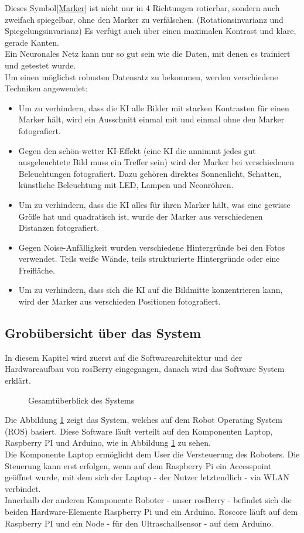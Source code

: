 \documentclass[conference]{IEEEtran}
\begin{document}
	Dieses Symbol\ref{Marker} ist nicht nur in 4 Richtungen rotierbar, sondern auch zweifach spiegelbar, ohne den Marker zu verfälschen. (Rotationsinvarianz und Spiegelungsinvarianz)
	Es verfügt auch über einen maximalen Kontrast und klare, gerade Kanten.
	\\
	\noindent
	Ein Neuronales Netz kann nur so gut sein wie die Daten, mit denen es 
	trainiert und getestet wurde.
	\\
	Um einen möglichst robusten Datensatz zu bekommen, werden verschiedene Techniken angewendet:
	\begin{itemize}
		\item Um zu verhindern, dass die KI alle Bilder mit starken Kontrasten für einen Marker hält, wird ein Ausschnitt einmal mit und einmal ohne den Marker fotografiert.
		\item Gegen den \glqq schön-wetter KI\grqq-Effekt (eine KI die annimmt jedes gut ausgeleuchtete Bild muss ein Treffer sein) wird der Marker bei verschiedenen Beleuchtungen fotografiert.
		Dazu gehören direktes Sonnenlicht, Schatten, künstliche Beleuchtung mit LED, Lampen und Neonröhren. 
		\item Um zu verhindern, dass die KI alles für ihren Marker hält, was eine gewisse Größe hat und quadratisch ist, wurde der Marker aus verschiedenen Distanzen fotografiert. 
		\item Gegen Noise-Anfälligkeit wurden verschiedene Hintergründe bei den Fotos verwendet. Teils weiße Wände, teils strukturierte Hintergründe oder eine Freifläche. 
		\item Um zu verhindern, dass sich die KI auf die Bildmitte konzentrieren kann, wird der Marker aus verschieden Positionen fotografiert. 
	\end{itemize}
	
	
	\subsection{Grobübersicht über das System}
	In diesem Kapitel wird zuerst auf die Softwarearchitektur und der 
	Hardwareaufbau von rosBerry eingegangen, danach wird das Software 
	System erklärt.
	
	\begin{figure}[!ht]
		\centering
		\def\svgwidth{9cm}
		
		\caption{Gesamtüberblick des Systems}
		\label{Gesamtzusammenhang}
	\end{figure}
	Die Abbildung \ref{Gesamtzusammenhang} zeigt das System, welches auf 
	dem Robot Operating System (ROS) basiert.
	Diese Software läuft verteilt auf den Komponenten Laptop, Raspberry PI und Arduino, wie in Abbildung \ref{Gesamtzusammenhang} zu sehen.
	\\
	Die Komponente Laptop ermöglicht dem User die Versteuerung des 
	Roboters.
	Die Steuerung kann erst erfolgen, wenn auf dem Raspberry Pi ein Accesspoint geöffnet wurde, mit dem sich der Laptop - der Nutzer letztendlich - via WLAN verbindet.
	\\
	Innerhalb der anderen Komponente Roboter - unser rosBerry - befindet sich die beiden Hardware-Elemente Raspberry Pi und ein Arduino. Roscore läuft auf dem Raspberry PI und ein Node - für den Ultraschallsensor - auf dem Arduino.
	
\end{document}
